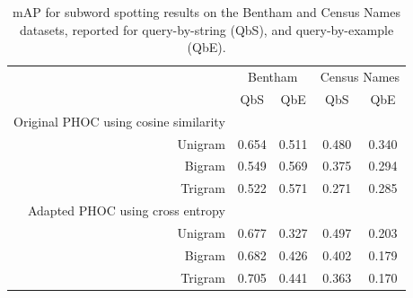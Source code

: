 \documentclass[ms,electronic,twosidetoc,letterpaper,chaptercenter,parttop,lof,lot]{byumsphd}
\begin{document}

\begin{table}
\centering
\begin{tabular}{| r | c c | c c |}
  \hline
   & \multicolumn{2}{c|}{Bentham} & \multicolumn{2}{c|}{Census Names}\\
   & QbS  & QbE    &  QbS &  QbE    \\
  \hline 
  Original PHOC using cosine similarity & & & & \\
  Unigram &  0.654 &  0.511  & 0.480 &  0.340 \\
  Bigram  &  0.549 &  0.569  & 0.375 &  0.294 \\
  Trigram &  0.522 &  0.571  & 0.271 &  0.285 \\
  \hline
  
  Adapted PHOC using cross entropy & & & & \\
  Unigram &  0.677 &  0.327  & 0.497 &  0.203 \\ 
  Bigram  &  0.682 &  0.426  & 0.402 &  0.179 \\
  Trigram &  0.705 &  0.441  & 0.363 &  0.170 \\
  \hline 
\end{tabular}
\caption{mAP for subword spotting results on the Bentham and Census Names datasets, reported for query-by-string (QbS), and query-by-example (QbE).}
\label{tab:subwordspotting}
\end{table}
\end{document}
